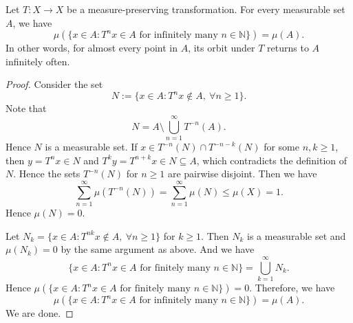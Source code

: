   \begin{theorem}
    Let $T: X \to X$ be a measure-preserving transformation. 
    For every measurable set $A$, we have 
    \[
      \mu\left(\{x \in A : T^n x \in A \text{ for infinitely many } n \in \mathbb{N}\}\right) = \mu(A).
    \]
    In other words, for almost every point in $A$, its orbit under $T$ returns to $A$ infinitely often.
  \end{theorem}
  \begin{proof}
    Consider the set
    \[ N := \{x \in A : T^n x \notin A , \ \forall n \geq 1\}. \]
    Note that 
    \[ N = A \setminus \bigcup_{n=1}^\infty T^{-n}(A). \]
    Hence $N$ is a measurable set.
    If $x \in T^{-n}(N) \cap T^{-n-k}(N)$ for some $n, k \geq 1$, then $y = T^n x \in N$ and $T^k y = T^{n+k} x \in N \subseteq A$, which contradicts the definition of $N$.
    Hence the sets $T^{-n}(N)$ for $n \geq 1$ are pairwise disjoint.
    Then we have 
    \[ \sum_{n=1}^\infty \mu(T^{-n}(N)) = \sum_{n=1}^\infty \mu(N) \leq \mu(X) = 1. \]
    Hence $\mu(N) = 0$.

    Let $N_k = \{x \in A : T^{nk} x \notin A , \ \forall n \geq 1\}$ for $k \geq 1$. 
    Then $N_k$ is a measurable set and $\mu(N_k) = 0$ by the same argument as above.
    And we have
    \[ \{x \in A : T^n x \in A \text{ for finitely many } n \in \mathbb{N}\} = \bigcup_{k=1}^\infty N_k. \]
    Hence $\mu\left(\{x \in A : T^n x \in A \text{ for finitely many } n \in \mathbb{N}\}\right) = 0$.
    Therefore, we have
    \[
      \mu\left(\{x \in A : T^n x \in A \text{ for infinitely many } n \in \mathbb{N}\}\right) = \mu(A).
    \]
    We are done.
  \end{proof}






